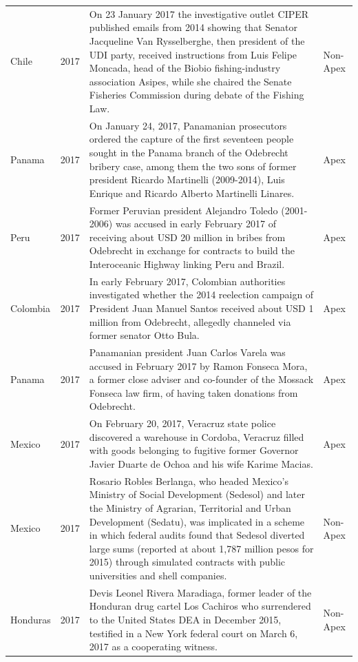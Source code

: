\begin{landscape}
\begin{longtable}{@{}l c p{15.5cm} l@{}}
Chile & 2017 & On 23 January 2017 the investigative outlet CIPER published emails from 2014 showing that Senator Jacqueline Van Rysselberghe, then president of the UDI party, received instructions from Luis Felipe Moncada, head of the Biobio fishing-industry association Asipes, while she chaired the Senate Fisheries Commission during debate of the Fishing Law. & Non-Apex \\
Panama & 2017 & On January 24, 2017, Panamanian prosecutors ordered the capture of the first seventeen people sought in the Panama branch of the Odebrecht bribery case, among them the two sons of former president Ricardo Martinelli (2009-2014), Luis Enrique and Ricardo Alberto Martinelli Linares. & Apex \\
Peru & 2017 & Former Peruvian president Alejandro Toledo (2001-2006) was accused in early February 2017 of receiving about USD 20 million in bribes from Odebrecht in exchange for contracts to build the Interoceanic Highway linking Peru and Brazil. & Apex \\
Colombia & 2017 & In early February 2017, Colombian authorities investigated whether the 2014 reelection campaign of President Juan Manuel Santos received about USD 1 million from Odebrecht, allegedly channeled via former senator Otto Bula. & Apex \\
Panama & 2017 & Panamanian president Juan Carlos Varela was accused in February 2017 by Ramon Fonseca Mora, a former close adviser and co-founder of the Mossack Fonseca law firm, of having taken donations from Odebrecht. & Apex \\
Mexico & 2017 & On February 20, 2017, Veracruz state police discovered a warehouse in Cordoba, Veracruz filled with goods belonging to fugitive former Governor Javier Duarte de Ochoa and his wife Karime Macias. & Apex \\
Mexico & 2017 & Rosario Robles Berlanga, who headed Mexico's Ministry of Social Development (Sedesol) and later the Ministry of Agrarian, Territorial and Urban Development (Sedatu), was implicated in a scheme in which federal audits found that Sedesol diverted large sums (reported at about 1,787 million pesos for 2015) through simulated contracts with public universities and shell companies. & Non-Apex \\
Honduras & 2017 & Devis Leonel Rivera Maradiaga, former leader of the Honduran drug cartel Los Cachiros who surrendered to the United States DEA in December 2015, testified in a New York federal court on March 6, 2017 as a cooperating witness. & Non-Apex \\

\end{longtable}
\end{landscape}
